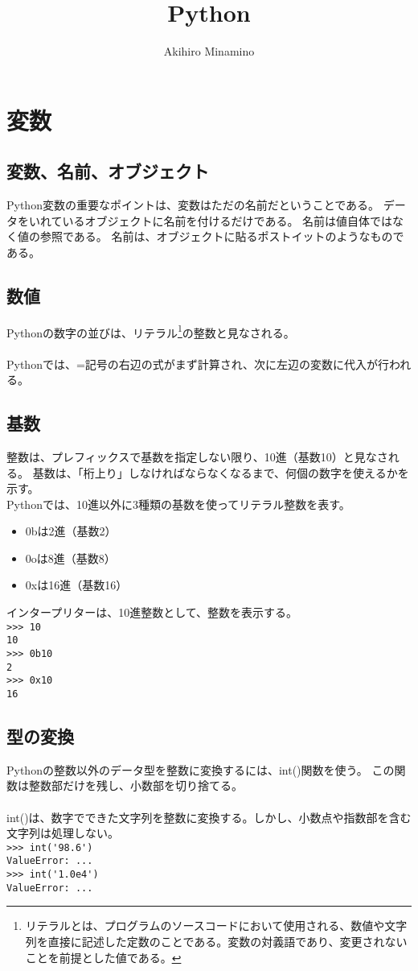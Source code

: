 \documentclass[11pt, oneside]{article}   	%
\title{Python}
\author{Akihiro Minamino}
\begin{document}
\maketitle
\section{変数}
\subsection{変数、名前、オブジェクト}
Python変数の重要なポイントは、変数はただの名前だということである。
データをいれているオブジェクトに名前を付けるだけである。
名前は値自体ではなく値の参照である。
名前は、オブジェクトに貼るポストイットのようなものである。

\subsection{数値}
Pythonの数字の並びは、リテラル\footnote{リテラルとは、プログラムのソースコードにおいて使用される、数値や文字列を直接に記述した定数のことである。変数の対義語であり、変更されないことを前提とした値である。}の整数と見なされる。\\
　\\
Pythonでは、=記号の右辺の式がまず計算され、次に左辺の変数に代入が行われる。

\subsection{基数}
整数は、プレフィックスで基数を指定しない限り、10進（基数10）と見なされる。
基数は、「桁上り」しなければならなくなるまで、何個の数字を使えるかを示す。\\
Pythonでは、10進以外に3種類の基数を使ってリテラル整数を表す。
\begin{itemize}
\item 0bは2進（基数2）
\item 0oは8進（基数8）
\item 0xは16進（基数16）
\end{itemize}
インタープリターは、10進整数として、整数を表示する。\\
\verb|>>> 10|\\
\verb|10|\\
\verb|>>> 0b10|\\
\verb|2|\\
\verb|>>> 0x10|\\
\verb|16|

\subsection{型の変換}
Pythonの整数以外のデータ型を整数に変換するには、int()関数を使う。
この関数は整数部だけを残し、小数部を切り捨てる。\\
　\\
int()は、数字でできた文字列を整数に変換する。しかし、小数点や指数部を含む文字列は処理しない。\\
\verb|>>> int('98.6')|\\
\verb|ValueError: ...|\\
\verb|>>> int('1.0e4')|\\
\verb|ValueError: ...|
\end{document}
